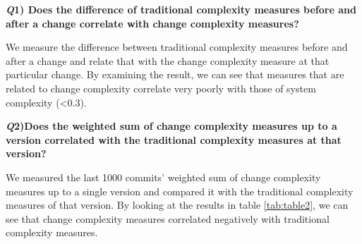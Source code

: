 \documentclass[9pt,twocolumn,a4paper]{article}
\begin{document}
{\bf{\emph Q1) Does the difference of traditional complexity measures before and after a change correlate with change complexity measures?}}
\newline

We measure the difference between traditional complexity measures before and after a change and relate that with the change complexity measure at that particular change. By examining the result, we can see that measures that are related to change complexity correlate very poorly with those of system complexity (\textless 0.3).
\newline

\begin{table}[ht]

\centering
{}
\caption {\small Correlation Matrix of Research Question 1.}
\label{tab:table1} 

\end{table}

{\bf{\emph Q2)Does the weighted sum of change complexity measures up to a version correlated with the traditional complexity measures at that version? }}
\newline

We measured the last 1000 commits' weighted sum of change complexity measures up to a single version and compared it with the traditional complexity measures of that version. By looking at the results in table \ref{tab:table2}, we can see that change complexity measures correlated negatively with traditional complexity measures.
\newline
\end{document}

